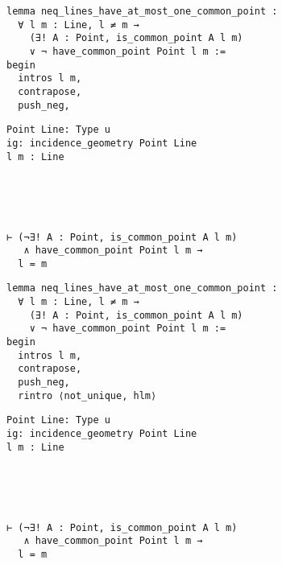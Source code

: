 \begin{frame}[fragile]
	\begin{multicols}{2}
		\begin{lstlisting}
lemma neq_lines_have_at_most_one_common_point :
  ∀ l m : Line, l ≠ m → 
    (∃! A : Point, is_common_point A l m) 
    ∨ ¬ have_common_point Point l m := 
begin
  intros l m,
  contrapose,
  push_neg,
\end{lstlisting}
		\columnbreak
		\begin{lstlisting}
Point Line: Type u
ig: incidence_geometry Point Line
l m : Line





⊢ (¬∃! A : Point, is_common_point A l m) 
   ∧ have_common_point Point l m → 
  l = m
		\end{lstlisting}
	\end{multicols}
\end{frame}










\begin{frame}[fragile]
	\begin{multicols}{2}
		\begin{lstlisting}
lemma neq_lines_have_at_most_one_common_point :
  ∀ l m : Line, l ≠ m → 
    (∃! A : Point, is_common_point A l m) 
    ∨ ¬ have_common_point Point l m := 
begin
  intros l m,
  contrapose,
  push_neg,
  rintro ⟨not_unique, hlm⟩
\end{lstlisting}
		\columnbreak
		\begin{lstlisting}
Point Line: Type u
ig: incidence_geometry Point Line
l m : Line





⊢ (¬∃! A : Point, is_common_point A l m) 
   ∧ have_common_point Point l m → 
  l = m
		\end{lstlisting}
	\end{multicols}
\end{frame}










